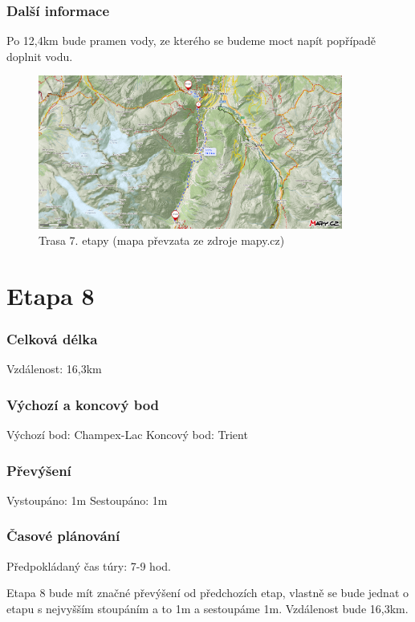 \subsubsection*{Další informace}
Po 12,4\:km bude pramen vody, ze kterého se budeme moct napít popřípadě doplnit vodu.
\begin{figure}[!hbt]
    \centering
    \includegraphics[width=10.0cm]{Figures/day_7.png}
    \caption[Trasa: den sedmý]{Trasa 7. etapy (mapa převzata ze zdroje mapy.cz)}
    \label{Obr:day_7}
\end{figure} 
\section{Etapa 8}
\subsubsection*{Celková délka}
\noindent Vzdálenost: 16,3\:km
\subsubsection*{Výchozí a koncový bod}
\noindent Výchozí bod: Champex-Lac
\noindent Koncový bod: Trient
\subsubsection*{Převýšení}
\noindent Vystoupáno: 1\:m
\noindent Sestoupáno: 1\:m
\subsubsection*{Časové plánování}
\noindent Předpokládaný čas túry: 7-9 hod.

Etapa 8 bude mít značné převýšení od předchozích etap, vlastně se bude jednat o etapu s nejvyšším stoupáním a to 1\:m a sestoupáme 1\:m. Vzdálenost bude 16,3\:km.
